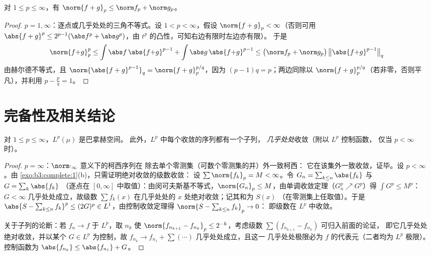 \begin{theorem}[闵可夫斯基不等式]\label{thm:b3:lp:minkowski}
对 $1 \leq p \leq \infty$，有 $\norm{f + g}_p \leq \norm f_p +
\norm g_p$。
\end{theorem}

\begin{proof}
$p = 1, \infty$：逐点或几乎处处的三角不等式。设 $1 <
p < \infty$，假设 $\norm{f+g}_p < \infty$（否则可用
$\abs{f+g}^p \leq 2^{p-1}(\abs f^p + \abs g^p)$，由
$t^p$ 的凸性，可知右边有限时左边亦有限）。
于是
\[
\norm{f{+}g}_p^p \leq \int\abs f\,\abs{f{+}g}^{p-1} +
\int\abs g\,\abs{f{+}g}^{p-1}
\leq \bigl(\norm f_p + \norm g_p\bigr)\,
\bigl\|\abs{f{+}g}^{p-1}\bigr\|_q
\]
由赫尔德不等式，且 $\norm{\abs{f+g}^{p-1}}_q =
\norm{f+g}_p^{p/q}$，因为 $(p-1)q = p$；两边同除以
$\norm{f+g}_p^{p/q}$（若非零，否则平凡），并利用 $p -
\frac pq = 1$。
\end{proof}

\section{完备性及相关结论}

\begin{theorem}[里斯–费舍尔]\label{thm:b3:lp:complete}
对 $1 \leq p \leq \infty$，$L^p(\mu)$ 是巴拿赫空间。
此外，$L^p$ 中每个收敛的序列都有一个子列，
\emph{几乎处处}收敛（附以 $L^p$ 控制函数，
仅当 $p < \infty$ 时）。
\end{theorem}

\begin{proof}
$p = \infty$：$\norm\cdot_\infty$ 意义下的柯西序列在
除去单个零测集（可数个零测集的并）外一致柯西：
它在该集外一致收敛，证毕。设 $p < \infty$。由
\cref{exo:b3:complete:1}(b)，只需证明绝对收敛的级数收敛：
设 $\sum\norm{f_k}_p = M < \infty$。令
$G_n = \sum_{k \leq n}\abs{f_k}$ 与 $G = \sum_k\abs{f_k}$
（逐点在 $[0,\infty]$ 中取值）：由闵可夫斯基不等式，$\norm{G_n}_p \leq
M$，由单调收敛定理（$G_n^p \nearrow G^p$）得 $\int G^p \leq M^p$：
$G < \infty$ 几乎处处成立，故级数 $\sum f_k(x)$
在几乎处处的 $x$ 处绝对收敛；记其和为 $S(x)$
（在零测集上任取值）。于是 $\abs{S - \sum_{k\leq n}f_k}^p \leq (2G)^p
\in L^1$，由控制收敛定理得 $\norm{S - \sum_{k\leq n}f_k}_p \to 0$：
即级数在 $L^p$ 中收敛。

关于子列的论断：若 $f_n \to f$ 于 $L^p$，取 $n_k$
使 $\norm{f_{n_{k+1}} - f_{n_k}}_p \leq 2^{-k}$，考虑级数
$\sum(f_{n_{k+1}} - f_{n_k})$ 可归入前面的论证，
即它几乎处处绝对收敛，并以某个 $G \in
L^p$ 为控制，故 $f_{n_k} \to f_{n_1} + \sum(\cdots) $ 几乎处处成立，且这一
几乎处处极限必为 $f$ 的代表元（二者均为 $L^p$
极限）。控制函数为 $\abs{f_{n_k}} \leq \abs{f_{n_1}} + G$。
\end{proof}

